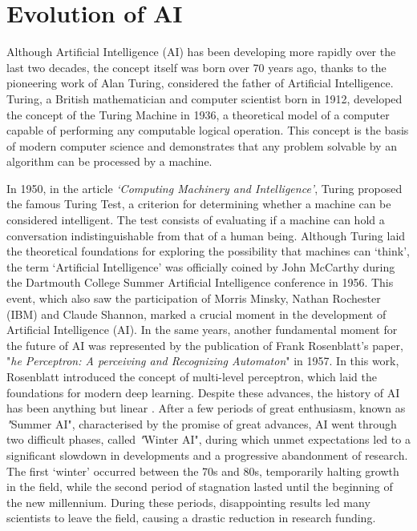 \section{Evolution of AI}
Although Artificial Intelligence (AI) has been developing more rapidly over the last two decades, the concept itself was born over 70 years ago, thanks to the pioneering work of Alan Turing, considered the father of Artificial Intelligence. Turing, a British mathematician and computer scientist born in 1912, developed the concept of the Turing Machine in 1936, a theoretical model of a computer capable of performing any computable logical operation. This concept is the basis of modern computer science and demonstrates that any problem solvable by an algorithm can be processed by a machine.

In 1950, in the article \textit{‘Computing Machinery and Intelligence’}\cite{Turing1950}, Turing proposed the famous Turing Test, a criterion for determining whether a machine can be considered intelligent. The test consists of evaluating if a machine can hold a conversation indistinguishable from that of a human being.
Although Turing laid the theoretical foundations for exploring the possibility that machines can ‘think’, the term ‘Artificial Intelligence’ was officially coined by John McCarthy during the Dartmouth College Summer Artificial Intelligence conference in 1956. This event, which also saw the participation of Morris Minsky, Nathan Rochester (IBM) and Claude Shannon, marked a crucial moment in the development of Artificial Intelligence (AI)\cite{GRZYBOWSKI2024221}.
In the same years, another fundamental moment for the future of AI was represented by the publication of Frank Rosenblatt's paper, "\textit{he Perceptron: A perceiving and Recognizing Automaton}"\cite{Rosenblatt1957} in 1957.
In this work, Rosenblatt introduced the concept of multi-level perceptron, which laid the foundations for modern deep learning. Despite these advances, the history of AI has been anything but linear \cite{Toosi_2021}.
After a few periods of great enthusiasm, known as \textit"{Summer AI}", characterised by the promise of great advances, AI went through two difficult phases, called \textit"{Winter AI}", during which unmet expectations led to a significant slowdown in developments and a progressive abandonment of research. The first ‘winter’ occurred between the 70s and 80s, temporarily halting growth in the field, while the second period of stagnation lasted until the beginning of the new millennium. During these periods, disappointing results led many scientists to leave the field, causing a drastic reduction in research funding.
